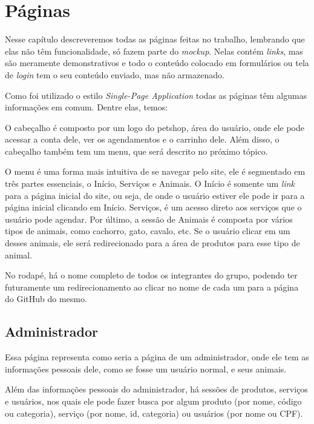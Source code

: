 \chapter{Páginas}
Nesse capítulo descreveremos todas as páginas feitas no trabalho, lembrando
que elas não têm funcionalidade, só fazem parte do \emph{mockup}. Nelas contém
\emph{links}, mas são meramente demonstrativos e todo o conteúdo colocado em
formulários ou tela de \emph{login} tem o seu conteúdo enviado, mas não
armazenado.

Como foi utilizado o estilo \emph{Single-Page Application} todas as páginas têm
algumas informações em comum. Dentre elas, temos:
\begin{description}[style=nextline]
	\item [Cabeçalho]	O cabeçalho é composto por um logo do petshop, área do
						usuário, onde ele pode acessar a conta dele, ver os
						agendamentos e o carrinho dele. Além disso, o cabeçalho
						também tem um menu, que será descrito no próximo tópico.
	\item [Menu]		O menu é uma forma mais intuitiva de se navegar pelo site,
						ele é segmentado em três partes essenciais, o Início,
						Serviços e Animais. O Início é somente um \emph{link} para
						a página inicial do site, ou seja, de onde o usuário estiver
						ele pode ir para a página inicial clicando em Início.
						Serviços, é um acesso direto aos serviços que o usuário pode
						agendar. Por último, a sessão de Animais é composta por
						vários tipos de animais, como cachorro, gato, cavalo, etc.
						Se o usuário clicar em um desses animais, ele será
						redirecionado para a área de produtos para esse tipo de animal.
	\item [Rodapé]		No rodapé, há o nome completo de todos os integrantes do grupo,
						podendo ter futuramente um redirecionamento ao clicar no nome
						de cada um para a página do	GitHub do mesmo.
\end{description}

\section{Administrador}
Essa página representa como seria a página de um administrador, onde ele tem
as informações pessoais dele, como se fosse um usuário normal, e seus animais.

Além das informações pessoais do administrador, há sessões de produtos,
serviços e usuários, nos quais ele pode fazer busca por algum produto (por nome,
código ou categoria), serviço (por nome, id, categoria) ou usuários (por nome ou
CPF).

